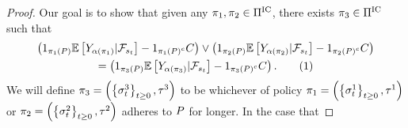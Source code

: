 \begin{proof}
    Our goal is to show that given any 
    \(
        \pi_1,\pi_2\in\Pi^{\text{IC}}
    \),
    there exists
    \(
        \pi_3\in\Pi^{\text{IC}}
    \)
    such that
    \begin{gather*}
        \rbr{
            1_{
                \policyfollowspath{\fixedpath}{\exchangepolicy_1}
            }
            \EE\sbr{
                \rewardss{
                    \stopstateforpolicy{
                        \exchangepolicy_1
                    }
                }
                | \statefiltss{\exchanget}
            }
            -
            1_{
                \policyfollowspath{\fixedpath}{\exchangepolicy_1}^c
            }
            \rewardbound
        }
        \vee
        \rbr{
            1_{
                \policyfollowspath{\fixedpath}{\exchangepolicy_2}
            }
            \EE\sbr{
                \rewardss{
                    \stopstateforpolicy{
                        \exchangepolicy_2
                    }
                }
                | \statefiltss{\exchanget}
            }
            -
            1_{
                \policyfollowspath{\fixedpath}{\exchangepolicy_2}^c
            }
            \rewardbound
        }
        \\
        =
        \rbr{
            1_{
                \policyfollowspath{\fixedpath}{\exchangepolicy_3}
            }
            \EE\sbr{
                \rewardss{
                    \stopstateforpolicy{
                        \exchangepolicy_3
                    }
                }
                | \statefiltss{\exchanget}
            }
            -
            1_{
                \policyfollowspath{\fixedpath}{\exchangepolicy_3}^c
            }
            \rewardbound
        } .
        \numberthis
        \label{eq:closed-under-maxima}
    \end{gather*}  
    We will define
    \(
        \pi_3
        =
        \left(
            \left\{
                \sigma_{t}^3
            \right\}_{t\geq 0},
            \tau^3
        \right)
    \)
    to be whichever of policy 
    \(
        \pi_1
        =
        \left(
            \left\{
                \sigma_{t}^1
            \right\}_{t\geq 0},
            \tau^1
        \right)
    \)
    or
    \(
        \pi_2
        =
        \left(
            \left\{
                \sigma_{t}^2
            \right\}_{t\geq 0},
            \tau^2
        \right)
    \)
    adheres to $P$ for longer. In the case that 

\end{proof}
